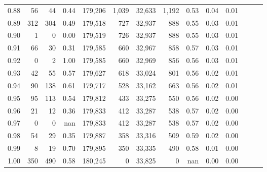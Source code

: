 \begin{tabular}{rrrrrrrrrrrrrr}
0.88 &      56 &     44 &  0.44 &  179,206 &    1,039 &  32,633 &   1,192 &  0.53 &  0.04 &      0.01 \\
0.89 &     312 &    304 &  0.49 &  179,518 &      727 &  32,937 &     888 &  0.55 &  0.03 &      0.01 \\
0.90 &       1 &      0 &  0.00 &  179,519 &      726 &  32,937 &     888 &  0.55 &  0.03 &      0.01 \\
0.91 &      66 &     30 &  0.31 &  179,585 &      660 &  32,967 &     858 &  0.57 &  0.03 &      0.01 \\
0.92 &       0 &      2 &  1.00 &  179,585 &      660 &  32,969 &     856 &  0.56 &  0.03 &      0.01 \\
0.93 &      42 &     55 &  0.57 &  179,627 &      618 &  33,024 &     801 &  0.56 &  0.02 &      0.01 \\
0.94 &      90 &    138 &  0.61 &  179,717 &      528 &  33,162 &     663 &  0.56 &  0.02 &      0.01 \\
0.95 &      95 &    113 &  0.54 &  179,812 &      433 &  33,275 &     550 &  0.56 &  0.02 &      0.00 \\
0.96 &      21 &     12 &  0.36 &  179,833 &      412 &  33,287 &     538 &  0.57 &  0.02 &      0.00 \\
0.97 &       0 &      0 &   nan &  179,833 &      412 &  33,287 &     538 &  0.57 &  0.02 &      0.00 \\
0.98 &      54 &     29 &  0.35 &  179,887 &      358 &  33,316 &     509 &  0.59 &  0.02 &      0.00 \\
0.99 &       8 &     19 &  0.70 &  179,895 &      350 &  33,335 &     490 &  0.58 &  0.01 &      0.00 \\
1.00 &     350 &    490 &  0.58 &  180,245 &        0 &  33,825 &       0 &   nan &  0.00 &      0.00 \\
\bottomrule
\end{tabular}
